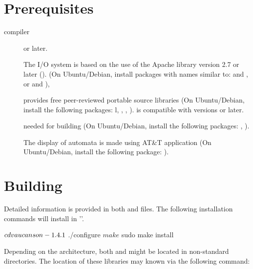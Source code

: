 \section{Prerequisites}
\label{sec:pre-req}%

\begin{description}
\item[\Cpp compiler]  or later.

\item[\XML] The \XML I/O system is based on the use of the Apache 
  \Cpp library version 2.7 or later (). (On
  Ubuntu/Debian, install packages with names similar to:  and ,
  or  and ),
%

\item[]  provides free peer-reviewed
portable \Cpp source
  libraries (On Ubuntu/Debian, install the following packages:
  l, , ,
  ).
  \vcsn is compatible with  versions  or later.
%

\item[] needed for building \tafkit  (On Ubuntu/Debian, install
  the following packages: , ).
%

\item[] The display of automata is made using AT\&T 
  application (On Ubuntu/Debian, install the following package: ).
%

\end{description}

\section{Building \vcsn}
\label{sec:bui-ld}%


Detailed information is provided in both  and 
files. The following installation commands will install \vcsn in
''.

\begin{shell}
$ cd vaucanson-1.4.1
$ ./configure
$ make
$ sudo make install
\end{shell}%


Depending on the architecture, both  and  might be located
in non-standard directories. 
The location of these
libraries may known via the following command:

